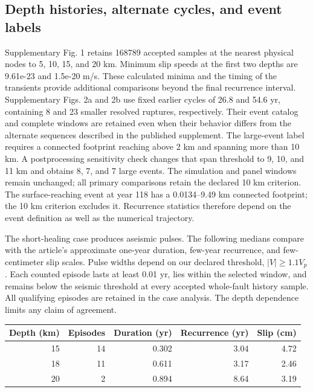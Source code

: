 \documentclass[11pt]{article}
\begin{document}
\subsection{Depth histories, alternate cycles, and event labels}
Supplementary Fig. 1 retains 168789 accepted samples at the nearest physical nodes to 5, 10, 15, and 20 km. Minimum slip speeds at the first two depths are 9.61e-23 and 1.5e-20 m/s. These calculated minima and the timing of the transients provide additional comparisons beyond the final recurrence interval. Supplementary Figs. 2a and 2b use fixed earlier cycles of 26.8 and 54.6 yr, containing 8 and 23 smaller resolved ruptures, respectively. Their event catalog and complete windows are retained even when their behavior differs from the alternate sequences described in the published supplement.
The large-event label requires a connected footprint reaching above 2 km and spanning more than 10 km. A postprocessing sensitivity check changes that span threshold to 9, 10, and 11 km and obtains 8, 7, and 7 large events. The simulation and panel windows remain unchanged; all primary comparisons retain the declared 10 km criterion. The surface-reaching event at year 118 has a 0.0134--9.49 km connected footprint; the 10 km criterion excludes it. Recurrence statistics therefore depend on the event definition as well as the numerical trajectory.

The short-healing case produces aseismic pulses. The following medians compare
with the article's approximate one-year duration, few-year recurrence, and
few-centimeter slip scales. Pulse widths depend on our declared
threshold, $|V|\geq1.1V_p$. Each counted episode lasts at least 0.01 yr, lies
within the selected window, and remains below the seismic threshold at every
accepted whole-fault history sample. All qualifying episodes are retained in
the case analysis. The depth dependence limits any claim of agreement.
\begin{center}\small
\begin{tabular}{rrrrr}\toprule
Depth (km) & Episodes & Duration (yr) & Recurrence (yr) & Slip (cm)\\\midrule
15 & 14 & 0.302 & 3.04 & 4.72\\
18 & 11 & 0.611 & 3.17 & 2.46\\
20 & 2 & 0.894 & 8.64 & 3.19\\
\bottomrule\end{tabular}\end{center}
\end{document}
